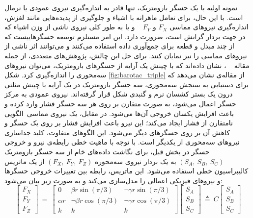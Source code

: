 نمونه اولیه  با یک حسگر بارومتریک، تنها قادر به اندازه‌گیری نیروی عمودی یا نرمال است. با این حال، برای تعامل ماهرانه با اشیاء و جلوگیری از پدیده‌هایی مانند لغزش، اندازه‌گیری نیروهای مماسی  
$F_{X}$
و
$F_{Y}$   
و یا به طور کلی نیروی ناشی از وزن اشیاء که در جهت بردار گرانش است، ضرورت دارد. این امر مستلزم توسعه حسگرهاییست که از چند مبدل و قطعه برای جمع‌آوری داده استفاده می‌کنند و می‌توانند اثر ناشی از نیرو‌های مماسی را نیز نمایان کنند. برای حل این چالش، پژوهش‌های متعددی، از جمله مقاله    
\cite{kim_barotac_2022}
، نشان داده‌اند که با چینش یک آرایه از حسگرهای بارومتریک، می‌توان نیروهای سه‌محوری را اندازه‌گیری کرد. شکل
\ref{fig:barotac_triple}
از مقاله‌ی 
\cite{kim_barotac_2022}
نشان می‌دهد که برای دستیابی به سنجش سه‌محوری، سه حسگر بارومتریک در یک آرایه با چینش مثلثی درون یک بستر کشسان نرم و گنبدی ‌شکل قرار گرفته‌اند. نیروی عمودی به مرکز حسگر اعمال می‌شود، به صورت متقارن بر روی هر سه حسگر فشار وارد کرده و باعث افزایش یکسان خروجی آن‌ها می‌شود. در مقابل، یک نیروی مماسی الگویی نامتقارن از فشار ایجاد می‌کند؛ این نیرو باعث افزایش فشار بر روی یک حسگر و کاهش آن بر روی حسگرهای دیگر می‌شود. این الگوهای متفاوت، کلید جداسازی نیروهای سه‌محوری از یکدیگر است. با توجه با ماهیت خطی رایطه‌ی نیرو و خروجی حسگر در بخش قبل، برای نگاشت داده‌های خام از سه حسگر بارومتریک 
$\left(S_{A},\:S_{B},\:S_{C}\right)$
 به یک بردار نیروی سه‌محوره 
$\left(F_{X},\:F_{Y},\:F_{Z}\right)$
از یک ماتریس کالیبراسیون خطی استفاده می‌شود. این ماتریس، رابطه بین تغییرات خروجی حسگرها و نیروهای فیزیکی اعمالی را مدل‌سازی می‌کند و به صورت زیر بیان می‌شود:   
\begin{equation}\label{eq:tri_baro}
	\begin{bmatrix}
		F_{X}\\F_{Y}\\F_{Z}
	\end{bmatrix}
\:
=
\:
	\begin{bmatrix}
	0 & \beta r \sin\left(\pi/3\right)& \neg \gamma r \sin\left(\pi/3\right)
	\\
	\alpha r & \neg \beta r \cos\left(\pi/3\right)& \neg \gamma r \cos\left(\pi/3\right)
	\\
	k&k&k
\end{bmatrix}
	\begin{bmatrix}
	S_{A}\\S_{B}\\S_{C}
\end{bmatrix}
\:
\triangleq
\:
C
\begin{bmatrix}
	S_{A}\\S_{B}\\S_{C}
\end{bmatrix}
\end{equation}
